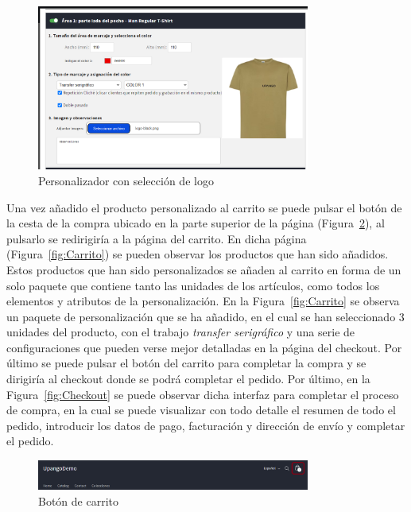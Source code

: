 \documentclass[12pt]{article}
\begin{document}
\begin{figure}[ht]
    \centering
    \includegraphics[width=0.8\textwidth]{imagenes/ManualUsuario/PersonalizadorLogoSeleccionado.png}
    \caption{\label{fig:PersonalizadorLogo}Personalizador con selección de logo}
    \vspace{\fill}
\end{figure}


Una vez añadido el producto personalizado al carrito se puede pulsar el botón de la cesta de la compra ubicado en la parte superior de la página (Figura~\ref{fig:BotonCarrito}), al pulsarlo se redirigiría a la página del carrito.
En dicha página (Figura~\ref{fig:Carrito}) se pueden observar los productos que han sido añadidos. Estos productos que han sido personalizados se añaden al carrito en forma de un solo paquete que contiene
tanto las unidades de los artículos, como todos los elementos y atributos de la personalización.
En la Figura~\ref{fig:Carrito} se observa un paquete de personalización que se ha añadido, en el cual se han seleccionado 3 unidades del producto, con el trabajo \textit{transfer serigráfico} y una serie de configuraciones 
que pueden verse mejor detalladas en la página del checkout. Por último se puede pulsar el botón del carrito para completar la compra y se dirigiría al checkout donde se podrá completar el pedido.
Por último, en la Figura~\ref{fig:Checkout} se puede observar dicha interfaz para completar el proceso de compra, en la cual se puede visualizar con todo detalle el resumen de todo el pedido, introducir los datos de pago, facturación y dirección de envío
y completar el pedido.


\begin{figure}[ht]
    \centering
    \includegraphics[width=0.8\textwidth]{imagenes/ManualUsuario/BotonCarrito.png}
    \caption{\label{fig:BotonCarrito}Botón de carrito}
    \vspace{\fill}
\end{figure}
\end{document}
